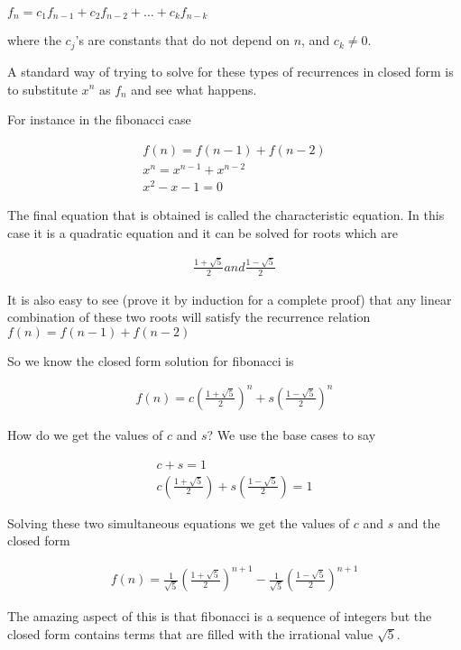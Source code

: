 \documentclass[12pt]{article}
\begin{document}
$f_n = c_1f_{n-1}+ c_2f_{n-2} + \ldots + c_kf_{n-k}$

where the $c_j$'s are constants that do not depend on $n$, and $c_k \neq  0$.

A standard way of trying to solve for these types of recurrences in closed form is to substitute $x^n$ as $f_n$ and see what happens.

For instance in the fibonacci case

\begin{align*}
f(n) = f(n-1) + f(n-2) \\
x^n = x^{n-1} + x^{n-2} \\
x^2 - x -1 = 0
\end{align*}

The final equation that is obtained is called the characteristic equation. In this case it is a quadratic equation and it can be solved for roots which are 

\begin{align*}
\frac{1 + \sqrt{5}}{2} and \frac{1 - \sqrt{5}}{2}
\end{align*}

It is also easy to see (prove it by induction for a complete proof) that any linear combination of these two roots will satisfy the recurrence relation $f(n) = f(n-1) + f(n-2)$

So we know the closed form solution for fibonacci is 

\begin{align*}
f(n) = c \left(\frac{1 + \sqrt{5}}{2} \right)^n + s \left(\frac{1 - \sqrt{5}}{2} \right)^n
\end{align*}

How do we get the values of $c$ and $s$? We use the base cases to say

\begin{align*}
c+ s  = 1 \\
c\left(\frac{1 + \sqrt{5}}{2}\right) + s\left(\frac{1 - \sqrt{5}}{2}\right) = 1 
\end{align*}

Solving these two simultaneous equations we get the values of $c$ and $s$ and the closed form

\begin{align*}
f(n) = \frac{1}{\sqrt{5}}\left(\frac{1 + \sqrt{5}}{2}\right)^{n+1} - \frac{1}{\sqrt{5}}\left(\frac{1 - \sqrt{5}}{2}\right)^{n+1}
\end{align*}

The amazing aspect of this is that fibonacci is a sequence of integers but the closed form contains terms that are filled with the irrational value $\sqrt{5}$.
\end{document}
